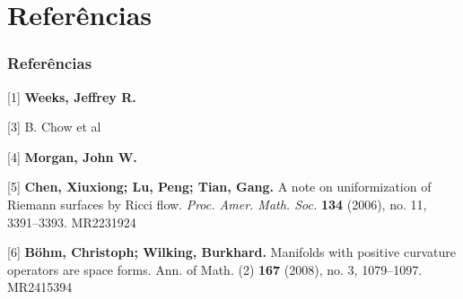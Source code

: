\documentclass{beamer}
\begin{document}
\section{Referências}
\begin{frame}
\frametitle{Referências}
\footnotesize{
\begin{thebibliography}{99} %




 [1] \textbf{Weeks, Jeffrey R.}


 [3] B. Chow et al

 [4] \textbf{Morgan, John W.}

 [5]
\textbf{Chen, Xiuxiong; Lu, Peng; Tian, Gang.} A note on uniformization of Riemann surfaces by Ricci flow. \emph{Proc. Amer. Math. Soc.} \textbf{134} (2006), no. 11, 3391--3393. MR2231924

 [6]
\textbf{Böhm, Christoph; Wilking, Burkhard.} Manifolds with positive curvature operators are space forms. Ann. of Math. (2) \textbf{167} (2008), no. 3, 1079--1097. MR2415394
\end{thebibliography}
}


\end{frame}
\end{document}
